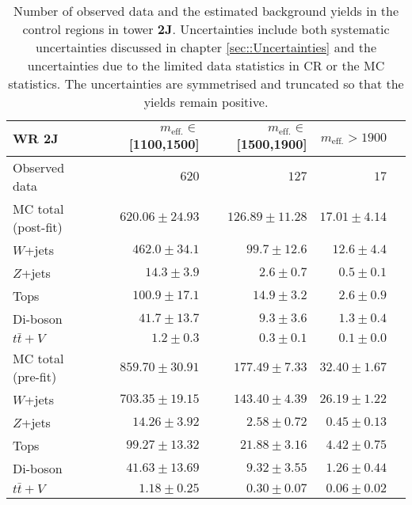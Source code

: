 \newcommand{\crtablecaption}[1]{%
      Number of observed data and the estimated background yields in the control regions in tower \textbf{#1}. 
      Uncertainties include both systematic uncertainties discussed in chapter \ref{sec::Uncertainties} and the uncertainties due to the limited data statistics in CR or the MC statistics. 
      The uncertainties are symmetrised and truncated so that the yields remain positive.
}

\begin{table}
  \begin{center}
    \caption{ \label{tab::BGestimation::CRyields_2J} \crtablecaption{2J}  }

    \begin{tabular*}{\textwidth}{@{\extracolsep{\fill}}lrrrr}
      \toprule
      \textbf{WR 2J} & $m_{\mathrm{eff.}}\in$[1100,1500] & $m_{\mathrm{eff.}}\in$[1500,1900] & $m_{\mathrm{eff.}}>1900$ \\
      \midrule

Observed data          & $620$              & $127$              & $17$                    \\
\midrule
\midrule
MC total (post-fit)         & $620.06 \pm 24.93$          & $126.89 \pm 11.28$          & $17.01 \pm 4.14$              \\
\midrule
        $W$+jets         & $462.0 \pm 34.1$          & $99.7 \pm 12.6$          & $12.6 \pm 4.4$              \\
        $Z$+jets         & $14.3 \pm 3.9$          & $2.6 \pm 0.7$          & $0.5 \pm 0.1$              \\
        Tops         & $100.9 \pm 17.1$          & $14.9 \pm 3.2$          & $2.6 \pm 0.9$              \\
        Di-boson         & $41.7 \pm 13.7$          & $9.3 \pm 3.6$          & $1.3 \pm 0.4$              \\
        $t\bar{t}+V$         & $1.2 \pm 0.3$          & $0.3 \pm 0.1$          & $0.1 \pm 0.0$              \\
\midrule
\midrule
MC total (pre-fit)              & $859.70 \pm 30.91$          & $177.49 \pm 7.33$          & $32.40 \pm 1.67$              \\
\midrule
        $W$+jets         & $703.35 \pm 19.15$          & $143.40 \pm 4.39$          & $26.19 \pm 1.22$              \\
        $Z$+jets         & $14.26 \pm 3.92$          & $2.58 \pm 0.72$          & $0.45 \pm 0.13$              \\
        Tops         & $99.27 \pm 13.32$          & $21.88 \pm 3.16$          & $4.42 \pm 0.75$              \\
        Di-boson         & $41.63 \pm 13.69$          & $9.32 \pm 3.55$          & $1.26 \pm 0.44$              \\
        $t\bar{t}+V$         & $1.18 \pm 0.25$          & $0.30 \pm 0.07$          & $0.06 \pm 0.02$              \\
    \bottomrule
    \end{tabular*}



\end{center}
\end{table}
